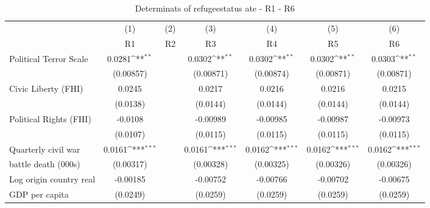 \begin{table}[!ht]\centering \scriptsize
	\def\sym#1{\ifmmode^{#1}\else\(^{#1}\)\fi}
	\caption{Determinats of refugeestatus ate - R1 - R6}
	\begin{tabular}{l*{6}{c}}
		\hline\hline
		&\multicolumn{1}{c}{(1)}     &\multicolumn{1}{c}{(2)}       &\multicolumn{1}{c}{(3)}       &\multicolumn{1}{c}{(4)}    	&\multicolumn{1}{c}{(5)}  	&\multicolumn{1}{c}{(6)}   \\
		&\multicolumn{1}{c}{R1}&\multicolumn{1}{c}{R2}&\multicolumn{1}{c}{R3}&\multicolumn{1}{c}{R4}&\multicolumn{1}{c}{R5}&\multicolumn{1}{c}{R6}\\
\hline
Political Terror Scale&      0.0281\sym{**} &                     &      0.0302\sym{**} &      0.0302\sym{**} &      0.0302\sym{**} &      0.0303\sym{**} \\
                    &   (0.00857)         &                     &   (0.00871)         &   (0.00874)         &   (0.00871)         &   (0.00871)         \\
[0.5em]
Civic Liberty (FHI) &      0.0245         &                     &      0.0217         &      0.0216         &      0.0216         &      0.0215         \\
                    &    (0.0138)         &                     &    (0.0144)         &    (0.0144)         &    (0.0144)         &    (0.0144)         \\
[0.5em]
Political Rights (FHI)&     -0.0108         &                     &    -0.00989         &    -0.00985         &    -0.00987         &    -0.00973         \\
                    &    (0.0107)         &                     &    (0.0115)         &    (0.0115)         &    (0.0115)         &    (0.0115)         \\
[0.5em]
Quarterly civil war &      0.0161\sym{***}&                     &      0.0161\sym{***}&      0.0162\sym{***}&      0.0162\sym{***}&      0.0162\sym{***}\\
battle death (000s)                    &   (0.00317)         &                     &   (0.00328)         &   (0.00325)         &   (0.00326)         &   (0.00326)         \\
[0.5em]
Log origin country real&    -0.00185         &                     &    -0.00752         &    -0.00766         &    -0.00702         &    -0.00675         \\
 GDP per capita                    &    (0.0249)         &                     &    (0.0259)         &    (0.0259)         &    (0.0259)         &    (0.0259)         \\

\end{tabular}
\end{table}
